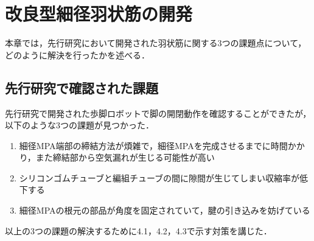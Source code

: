 \newpage
\section{改良型細径羽状筋の開発}
本章では，先行研究\cite{hasegawa}において開発された羽状筋に関する3つの課題点について，どのように解決を行ったかを述べる．
\subsection{先行研究で確認された課題}
先行研究\cite{hasegawa}で開発された歩脚ロボットで脚の開閉動作を確認することができたが，以下のような3つの課題が見つかった．
\begin{enumerate}
  \item 細径MPA端部の締結方法が煩雑で，細径MPAを完成させるまでに時間かかり，また締結部から空気漏れが生じる可能性が高い
  \item シリコンゴムチューブと編組チューブの間に隙間が生じてしまい収縮率が低下する
  \item 細径MPAの根元の部品が角度を固定されていて，腱の引き込みを妨げている
\end{enumerate}
以上の3つの課題の解決するために4.1，4.2，4.3で示す対策を講じた．
